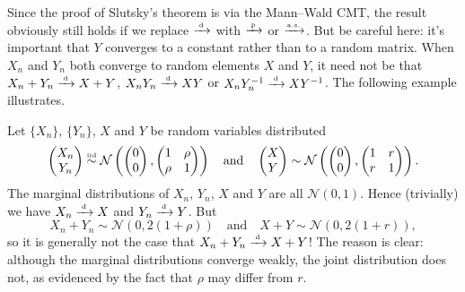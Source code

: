\documentclass[11pt,letterpaper,reqno,oneside]{article}
\begin{document}
\begin{remark}
	Since the proof of Slutsky's theorem is via the Mann--Wald CMT, the result obviously still holds if we replace $\xrightarrow{{\scriptscriptstyle \mathrm{\;d\;}}}$ with $\xrightarrow{{\scriptscriptstyle \mathrm{\;p\;}}}$ or $\xrightarrow{{\scriptscriptstyle \mathrm{a.s.}}}$. But be careful here: it's important that $Y$ converges to a constant rather than to a random matrix. When $X_n$ and $Y_n$ both converge to random elements $X$ and $Y$, it need not be that $X_n + Y_n \xrightarrow{{\scriptscriptstyle \mathrm{\;d\;}}} X + Y$, $X_n Y_n \xrightarrow{{\scriptscriptstyle \mathrm{\;d\;}}} X Y$ or $X_n Y_n^{-1} \xrightarrow{{\scriptscriptstyle \mathrm{\;d\;}}} X Y^{-1}$. The following example illustrates.
\end{remark}

\begin{example}
	Let $\{ X_n \}$, $\{ Y_n \}$, $X$ and $Y$ be random variables distributed
	\begin{equation*}
		\begin{pmatrix}
			X_n \\
			Y_n
		\end{pmatrix}
		\protect\overset{{\scriptscriptstyle \mathrm{iid}}}{\sim}
		\mathcal{N}\left(
		\begin{pmatrix}
			0 \\
			0
		\end{pmatrix}
		,
		\begin{pmatrix}
			1 & \rho \\
			\rho & 1
		\end{pmatrix} 
		\right)
		\quad\text{and}\quad
		\begin{pmatrix}
			X \\
			Y
		\end{pmatrix}
		\sim
		\mathcal{N}\left(
		\begin{pmatrix}
			0 \\
			0
		\end{pmatrix}
		,
		\begin{pmatrix}
			1 & r \\
			r & 1
		\end{pmatrix} 
		\right) .
	\end{equation*}
	The marginal distributions of $X_n$, $Y_n$, $X$ and $Y$ are all $\mathcal{N}(0,1)$. Hence (trivially) we have $X_n \xrightarrow{{\scriptscriptstyle \mathrm{\;d\;}}} X$ and $Y_n \xrightarrow{{\scriptscriptstyle \mathrm{\;d\;}}} Y$. But
	\begin{equation*}
		X_n + Y_n \sim \mathcal{N}( 0, 2(1+\rho) )
		\quad\text{and}\quad
		X + Y \sim \mathcal{N}( 0, 2(1+r) ) ,
	\end{equation*}
	so it is generally not the case that $X_n + Y_n \xrightarrow{{\scriptscriptstyle \mathrm{\;d\;}}} X + Y$! The reason is clear: although the marginal distributions converge weakly, the joint distribution does not, as evidenced by the fact that $\rho$ may differ from $r$.
\end{example}
\end{document}
